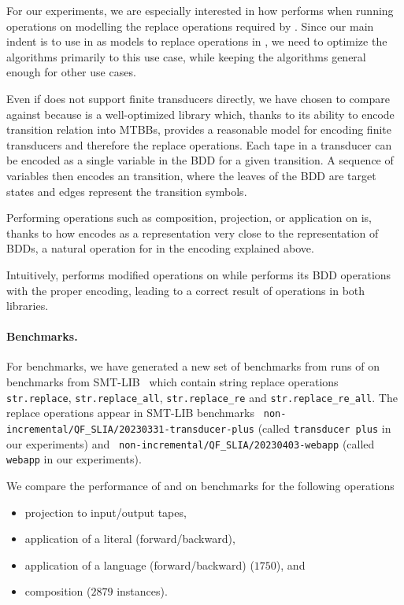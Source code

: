 For our experiments, we are especially interested in how \mata performs when running operations on \nfts modelling the replace operations required by \noodler.
Since our main indent is to use \nfts in \mata as models to replace operations in \noodler, we need to optimize the \nft algorithms primarily to this use case, while keeping the \nft algorithms general enough for other use cases.

Even if \mona does not support finite transducers directly, we have chosen \mona to compare \mata against because \mona is a well-optimized library which, thanks to its ability to encode transition relation into MTBBs, provides a reasonable model for encoding finite transducers and therefore the replace operations.
Each tape in a transducer can be encoded as a single variable in the BDD for a given transition.
A sequence of variables then encodes an \nft transition, where the leaves of the BDD are target states and edges represent the transition symbols.

Performing operations such as composition, projection, or application on \nfts is, thanks to how \mata encodes \nfts as a representation very close to the representation of BDDs, a natural operation for \mona in the encoding explained above.

Intuitively, \mata performs modified \nfa operations on \nfts while \mona performs its BDD operations with the proper encoding, leading to a correct result of \nft operations in both libraries.

\paragraph{Benchmarks.}

For benchmarks, we have generated a new set of benchmarks from runs of \noodler on benchmarks from SMT-LIB~\cite{SMTLIB} which contain string replace operations \texttt{str.replace}, \texttt{str.replace\_all}, \texttt{str.replace\_re} and \texttt{str.replace\_re\_all}.
The replace operations appear in SMT-LIB benchmarks \texttt{
non-incremental/QF\_SLIA/20230331-transducer-plus} (called \texttt{transducer plus} in our experiments) and \texttt{
non-incremental/QF\_SLIA/20230403-webapp} (called \texttt{webapp} in our experiments).

We compare the performance of \mata and \mona on benchmarks for the following operations
\begin{itemize}
  \item projection to input/output tapes,
  \item application of a literal (forward/backward),
  \item application of a language (forward/backward) ($1750$), and
  \item composition ($2879$ instances).
\end{itemize}

